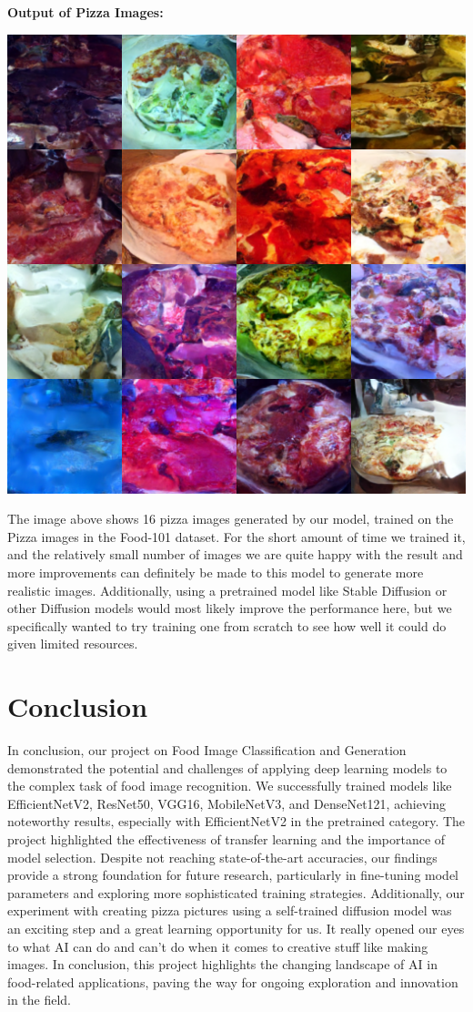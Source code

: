 \documentclass{article}
\begin{document}
\textbf{Output of Pizza Images:}

\begin{center}
    \includegraphics[width=0.7\linewidth, height=0.6\linewidth]{./images/generated-pizza-images.png}
\end{center}

The image above shows 16 pizza images generated by our model, trained on the Pizza images in the Food-101 dataset. For the short amount of time we trained it, and the relatively small number of images we are quite happy with the result and more improvements can definitely be made to this model to generate more realistic images. Additionally, using a pretrained model like Stable Diffusion or other Diffusion models would most likely improve the performance here, but we specifically wanted to try training one from scratch to see how well it could do given limited resources.

\section{Conclusion}

In conclusion, our project on Food Image Classification and Generation demonstrated the potential and challenges of applying deep learning models to the complex task of food image recognition. We successfully trained models like EfficientNetV2, ResNet50, VGG16, MobileNetV3, and DenseNet121, achieving noteworthy results, especially with EfficientNetV2 in the pretrained category. The project highlighted the effectiveness of transfer learning and the importance of model selection. Despite not reaching state-of-the-art accuracies, our findings provide a strong foundation for future research, particularly in fine-tuning model parameters and exploring more sophisticated training strategies.  Additionally, our experiment with creating pizza pictures using a self-trained diffusion model was an exciting step and a great learning opportunity for us. It really opened our eyes to what AI can do and can't do when it comes to creative stuff like making images. In conclusion, this project highlights the changing landscape of AI in food-related applications, paving the way for ongoing exploration and innovation in the field.
\end{document}
